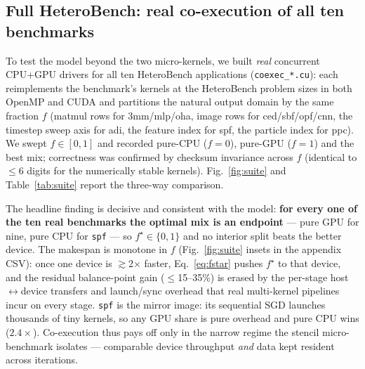 \documentclass[conference]{IEEEtran}
\begin{document}
\subsection{Full HeteroBench: real co-execution of all ten benchmarks}
\label{sec:suite}
To test the model beyond the two micro-kernels, we built \emph{real} concurrent
CPU+GPU drivers for all ten HeteroBench applications (\texttt{coexec\_*.cu}): each
reimplements the benchmark's kernels at the HeteroBench problem sizes in both OpenMP
and CUDA and partitions the natural output domain by the same fraction $f$ (matmul
rows for 3mm/mlp/oha, image rows for ced/sbf/opf/cnn, the timestep sweep axis for adi,
the feature index for spf, the particle index for ppc). We swept $f\in[0,1]$ and
recorded pure-CPU ($f{=}0$), pure-GPU ($f{=}1$) and the best mix; correctness was
confirmed by checksum invariance across $f$ (identical to $\le$6 digits for the
numerically stable kernels). Fig.~\ref{fig:suite} and Table~\ref{tab:suite} report the
three-way comparison.

The headline finding is decisive and consistent with the model: \textbf{for every one of
the ten real benchmarks the optimal mix is an endpoint} --- pure GPU for nine,
pure CPU for \texttt{spf} --- so $f^\star\!\in\!\{0,1\}$ and no interior split beats the
better device. The makespan is monotone in $f$ (Fig.~\ref{fig:suite} insets in the
appendix CSV): once one device is $\gtrsim$2$\times$ faster, Eq.~\ref{eq:fstar} pushes
$f^\star$ to that device, and the residual balance-point gain ($\le$15--35\%) is erased by
the per-stage host$\leftrightarrow$device transfers and launch/sync overhead that real
multi-kernel pipelines incur on every stage. \texttt{spf} is the mirror image: its
sequential SGD launches thousands of tiny kernels, so any GPU share is pure overhead and
pure CPU wins ($2.4\times$). Co-execution thus pays off only in the narrow regime the
stencil micro-benchmark isolates --- comparable device throughput \emph{and} data kept
resident across iterations.
\end{document}
